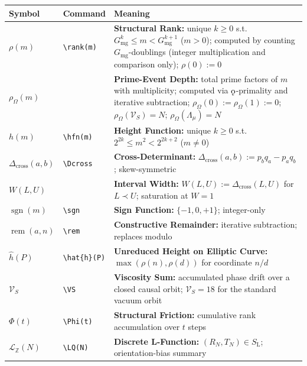 \documentclass[11pt, letterpaper]{article}
\newcommand{\SL}{S_{\mathrm{L}}}
\newcommand{\rank}{\rho}
\newcommand{\hfn}{h}
\newcommand{\Dcross}{\Delta_{\mathrm{cross}}}
\newcommand{\sgn}{\operatorname{sgn}}
\newcommand{\rem}{\operatorname{rem}}
\newcommand{\koppa}{\mathbin{\text{\rm\k{o}}}}
\newcommand{\LQ}{\mathcal{L}_{\mathbb{Z}}}
\newcommand{\VS}{\mathcal{V}_S}
\theoremstyle{definition}
\theoremstyle{plain}
\begin{document}
\begin{longtable}{L{2.2cm} L{2.6cm} L{8.5cm}}
\toprule
\textbf{Symbol} & \textbf{Command} & \textbf{Meaning} \\
\midrule\endhead\bottomrule\endfoot

$\rank(m)$ & \verb|\rank(m)| & \textbf{Structural Rank:}
  unique $k\geq 0$ s.t.\ $G_{\mathrm{mg}}^k\leq m<G_{\mathrm{mg}}^{k+1}$
  ($m>0$); computed by counting $G_{\mathrm{mg}}$-doublings (integer
  multiplication and comparison only); $\rank(0):=0$ \\[3pt]
  
  $\rho_\Omega(m)$ & & \textbf{Prime-Event Depth:}
  total prime factors of $m$ with multiplicity; computed via
  $\koppa$-primality and iterative subtraction; $\rho_\Omega(0):=\rho_\Omega(1):=0$;
  $\rho_\Omega(\mathcal{V}_S)=N$; $\rho_\Omega(\Lambda_\mu)=N$ \\[3pt]

$\hfn(m)$ & \verb|\hfn(m)| & \textbf{Height Function:}
  unique $k\geq 0$ s.t.\ $2^{2k}\leq m^2<2^{2k+2}$ ($m\neq 0$) \\[3pt]

$\Dcross(a,b)$ & \verb|\Dcross| & \textbf{Cross-Determinant:}
  $\Dcross(a,b):=p_b q_a-p_a q_b$; skew-symmetric \\[3pt]

$W(L,U)$ & & \textbf{Interval Width:}
  $W(L,U):=\Dcross(L,U)$ for $L\prec U$; saturation at $W=1$ \\[3pt]

$\sgn(m)$ & \verb|\sgn| & \textbf{Sign Function:}
  $\{-1,0,+1\}$; integer-only \\[3pt]

$\rem(a,n)$ & \verb|\rem| & \textbf{Constructive Remainder:}
  iterative subtraction; replaces modulo \\[3pt]

$\hat{h}(P)$ & \verb|\hat{h}(P)| & \textbf{Unreduced Height on Elliptic Curve:}
  $\max(\rank(n),\rank(d))$ for coordinate $n/d$ \\[3pt]

$\VS$ & \verb|\VS| & \textbf{Viscosity Sum:}
  accumulated phase drift over a closed causal orbit;
  $\VS = 18$ for the standard vacuum orbit \\[3pt]

$\Phi(t)$ & \verb|\Phi(t)| & \textbf{Structural Friction:}
  cumulative rank accumulation over $t$ steps \\[3pt]

$\LQ(N)$ & \verb|\LQ(N)| & \textbf{Discrete L-Function:}
  $(R_N,T_N)\in\SL$; orientation-bias summary \\[3pt]


\end{longtable}
\end{document}

